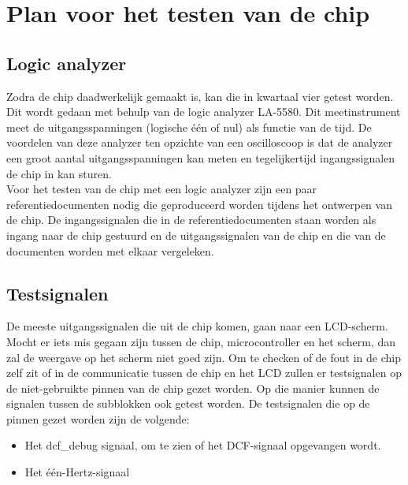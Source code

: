 \chapter{Plan voor het testen van de chip}

\section{Logic analyzer}
Zodra de chip daadwerkelijk gemaakt is, kan die in kwartaal vier getest worden. Dit wordt gedaan met behulp van de logic analyzer LA-5580. Dit meetinstrument meet de uitgangsspanningen (logische \'e\'en of nul) als functie van de tijd. De voordelen van deze analyzer ten opzichte van een oscilloscoop is dat de analyzer een groot aantal uitgangsspanningen kan meten en tegelijkertijd ingangssignalen de chip in kan sturen.\\
Voor het testen van de chip met een logic analyzer zijn een paar referentiedocumenten nodig die geproduceerd worden tijdens het ontwerpen van de chip. De ingangssignalen die in de referentiedocumenten staan worden als ingang naar de chip gestuurd en de uitgangssignalen van de chip en die van de documenten worden met elkaar vergeleken.

\section{Testsignalen}
De meeste uitgangssignalen die uit de chip komen, gaan naar een LCD-scherm. Mocht er iets mis gegaan zijn tussen de chip, microcontroller en het scherm, dan zal de weergave op het scherm niet goed zijn. Om te checken of de fout in de chip zelf zit of in de communicatie tussen de chip en het LCD zullen er testsignalen op de niet-gebruikte pinnen van de chip gezet worden. Op die manier kunnen de signalen tussen de subblokken ook getest worden.
De testsignalen die op de pinnen gezet worden zijn de volgende:
\begin{itemize}
\item Het dcf\_debug signaal, om te zien of het DCF-signaal opgevangen wordt.
\item Het \'e\'en-Hertz-signaal
\end{itemize}